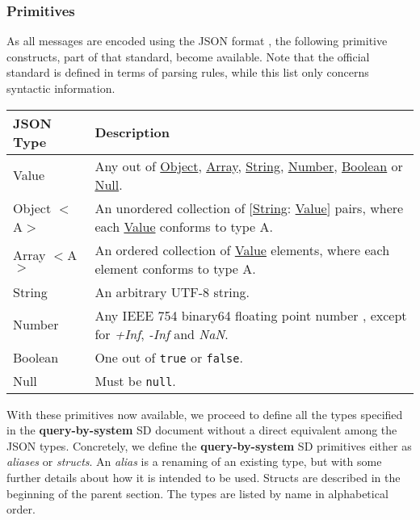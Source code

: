 \documentclass[a4paper]{arrowhead}
\newcommand{\pdef}[1]{{\textcolor{ArrowheadGrey}{#1 \label{sec:model:primitives:#1} \label{sec:model:primitives:#1s}}}}
\newcommand{\pref}[1]{{\textcolor{ArrowheadGrey}{\hyperref[sec:model:primitives:#1]{#1}}}}
\begin{document}
\newpage

\subsubsection{Primitives}
\label{sec:model:primitives}

As all messages are encoded using the JSON format \cite{bray2014json}, the following primitive constructs, part of that standard, become available.
Note that the official standard is defined in terms of parsing rules, while this list only concerns syntactic information. 

\begin{table}[ht!]
\begin{tabularx}{\textwidth}{| p{3cm} | X |} \hline
\rowcolor{gray!33} JSON Type & Description \\ \hline
\pdef{Value}                 & Any out of \pref{Object}, \pref{Array}, \pref{String}, \pref{Number}, \pref{Boolean} or \pref{Null}. \\ \hline
\pdef{Object}$<$A$>$         & An unordered collection of $[$\pref{String}: \pref{Value}$]$ pairs, where each \pref{Value} conforms to type A. \\ \hline
\pdef{Array}$<$A$>$          & An ordered collection of \pref{Value} elements, where each element conforms to type A. \\ \hline
\pdef{String}                & An arbitrary UTF-8 string. \\ \hline
\pdef{Number}                & Any IEEE 754 binary64 floating point number \cite{cowlishaw2019floating}, except for \textit{+Inf}, \textit{-Inf} and \textit{NaN}. \\ \hline
\pdef{Boolean}               & One out of \texttt{true} or \texttt{false}. \\ \hline
\pdef{Null}                  & Must be \texttt{null}. \\ \hline
\end{tabularx}
\end{table}

With these primitives now available, we proceed to define all the types specified in the \textbf{query-by-system} SD document without a direct equivalent among the JSON types.
Concretely, we define the \textbf{query-by-system} SD primitives either as \textit{aliases} or \textit{structs}.
An \textit{alias} is a renaming of an existing type, but with some further details about how it is intended to be used.
Structs are described in the beginning of the parent section.
The types are listed by name in alphabetical order.
\end{document}
